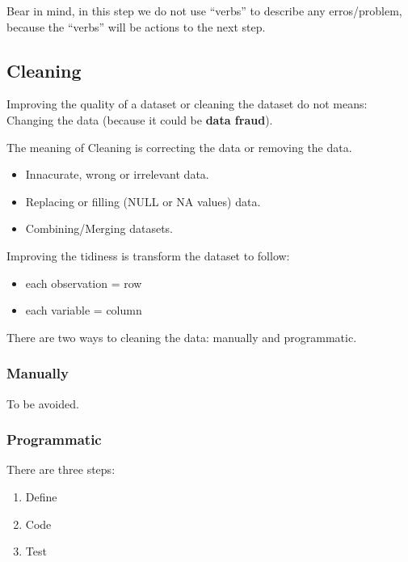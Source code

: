 \documentclass[]{book}
\providecommand{\tightlist}{%
  \setlength{\itemsep}{0pt}\setlength{\parskip}{0pt}}
\begin{document}
Bear in mind, in this step we do not use ``verbs'' to describe any
erros/problem, because the ``verbs'' will be actions to the next step.

\subsection{Cleaning}\label{cleaning}

Improving the quality of a dataset or cleaning the dataset do not means:
Changing the data (because it could be \textbf{data fraud}).

The meaning of Cleaning is correcting the data or removing the data.

\begin{itemize}
\tightlist
\item
  Innacurate, wrong or irrelevant data.
\item
  Replacing or filling (NULL or NA values) data.
\item
  Combining/Merging datasets.
\end{itemize}

Improving the tidiness is transform the dataset to follow:

\begin{itemize}
\tightlist
\item
  each observation = row
\item
  each variable = column
\end{itemize}

There are two ways to cleaning the data: manually and programmatic.

\subsubsection{Manually}\label{manually}

To be avoided.

\subsubsection{Programmatic}\label{programmatic}

There are three steps:

\begin{enumerate}
\def\labelenumi{\arabic{enumi}.}
\tightlist
\item
  Define
\item
  Code
\item
  Test
\end{enumerate}
\end{document}
